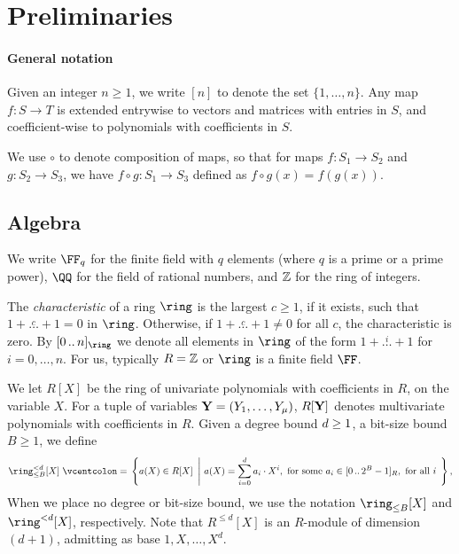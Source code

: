 \documentclass[11pt,letterpaper,usenames,dvipsnames]{article}
\begin{document}
\section{Preliminaries}

\paragraph{General notation} Given an integer $n\geq 1$, we write $[n]$ to denote the set $\{1,\ldots, n\}$. Any map $f: S\to T$ is extended entrywise to vectors and matrices with entries in $S$, and coefficient-wise to polynomials with coefficients in $S$.

We use $\circ$ to denote composition of maps, so that for maps $f: S_1\to S_2$ and $g:S_2\to S_3$, we have $f\circ g: S_1 \to S_3$ defined as $f\circ g(x) = f(g(x))$. 

\subsection{Algebra}
We write $\FF_q$ for the finite field with $q$ elements (where $q$ is a prime or a prime power), $\QQ$ for the field of rational numbers, and $\mathbb{Z}$ for the ring of integers. %

The \emph{characteristic} of a ring $\ring$ is the largest $c\geq 1$, if it exists, such that $1 + \overset{c}{\ldots} + 1 = 0$ in $\ring$. Otherwise, if $1 + \overset{c}{\ldots} + 1 \neq 0$ for all $c$, the characteristic is zero. By $\range{0}{n}_\ring$ we denote all elements in $\ring$ of the form $1 + \overset{i}{\ldots} + 1$ for $i=0,\ldots, n$. For us, typically $R=\mathbb{Z}$ or $\ring$ is a finite field $\FF$. 


We let $R[X]$ be the ring of univariate polynomials with coefficients in $R$, on the variable $X$. For a tuple of variables $\mathbf{Y}=(Y_1,\ldots, Y_\mu)$, $R[\mathbf{Y}]$ denotes multivariate polynomials with coefficients in $R$.  Given a degree bound $d\geq 1$, a bit-size bound $B\geq 1$, we define 
%
$$
\ringtwobounds{B}{\moduledegree}[X]\defeq \left\{a(X) \in R[X]\ \left| \ a(X) = \sum_{i=0}^{d} a_i\cdot X^i, \ \text{for some } a_i \in \range{0}{2^B-1}_R, \ \text{for all }i \ \right.\right\},
$$
When we place no degree or bit-size bound, we use the notation $\ringbitbound{B}[X]$ and $\ringdegbound{\moduledegree}[X]$, respectively. Note that $R^{\leq d}[X]$ is an $R$-module of dimension $(d+1)$, admitting as base $1, X, \ldots, X^d$.
\end{document}
